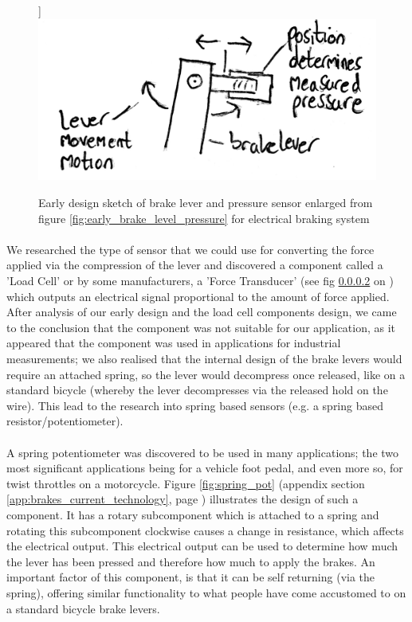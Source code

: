 \documentclass[a4paper]{report}
\begin{document}
\begin{figure}[!htb]]
\centering
\includegraphics[scale=0.25]{figures/early_sketches/braking_system/brake_lever_pressure_sensor_enlarged}
\caption{Early design sketch of brake lever and pressure sensor enlarged from figure \ref{fig:early_brake_level_pressure} for electrical braking system}
\label{fig:early_brake_level_pressure_enlarged}
\end{figure}


\paragraph{}We researched the type of sensor that we could use for converting the force applied via the compression of the lever and discovered a component called a 'Load Cell' or by some manufacturers, a 'Force Transducer' (see fig \ref{}  on \pageref{}) which outputs an electrical signal proportional to the amount of force applied. After analysis of our early design and the load cell components design, we came to the conclusion that the component was not suitable for our application, as it appeared that the component was used in applications for industrial measurements; we also realised that the internal design of the brake levers would require an attached spring, so the lever would decompress once released, like on a standard bicycle (whereby the lever decompresses via the released hold on the wire). This lead to the research into spring based sensors (e.g. a spring based resistor/potentiometer). 

\paragraph{}A spring potentiometer was discovered to be used in many applications; the two most significant applications being for a vehicle foot pedal, and even more so, for twist throttles on a motorcycle. Figure \ref{fig:spring_pot} (appendix section \ref{app:brakes_current_technology}, page \pageref{fig:spring_pot}) illustrates the design of such a component. It has a rotary subcomponent which is attached to a spring and rotating this subcomponent clockwise causes a change in resistance, which affects the electrical output. This electrical output can be used to determine how much the lever has been pressed and therefore how much to apply the brakes. An important factor of this component, is that it can be self returning (via the spring), offering similar functionality to what people have come accustomed to on a standard bicycle brake levers.
\end{document}
